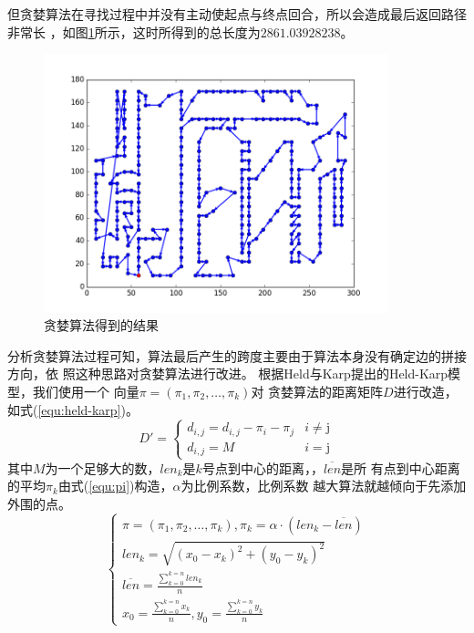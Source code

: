 \documentclass[fontset=windows,a4paper,12pt]{ctexart}
\begin{document}
         但贪婪算法在寻找过程中并没有主动使起点与终点回合，所以会造成最后返回路径非常长
         ，如图\ref{fig:fail}所示，这时所得到的总长度为$2861.03928238$。
         \begin{figure}[htbp]
            \centering
            \includegraphics[width=10cm]{pic/greedy_fail.png}
            \caption{贪婪算法得到的结果}
            \label{fig:fail}
        \end{figure}
        分析贪婪算法过程可知，算法最后产生的跨度主要由于算法本身没有确定边的拼接方向，依
        照这种思路对贪婪算法进行改进。
        根据Held与Karp提出的Held-Karp模型\cite{held1970traveling}，我们使用一个
        向量$\pi=(\pi_1,\pi_2,\dots,\pi_k)$对
        贪婪算法的距离矩阵$D$进行改造，如式(\ref{equ:held-karp})。
        \begin{equation}
	        D'=\left\{
		        \begin{array}{ll}
		        	d_{i,j} = d_{i,j} - \pi_i - \pi_j & \textrm{$i \neq $j}\\
		        	d_{i,j} = M & \textrm{$i=$j}
		        \end{array}
	        \right.
	        \label{equ:held-karp}
        \end{equation}
        其中$M$为一个足够大的数，$len_k$是$k$号点到中心的距离，，$\overline{len}$是所
        有点到中心距离的平均$\pi_k$由式(\ref{equ:pi})构造，$\alpha$为比例系数，比例系数
        越大算法就越倾向于先添加外围的点。
        \begin{equation}
             \left\{
	             \begin{array}{l}
		             \pi=(\pi_1,\pi_2,\dots{,\pi_k}),\pi_k=\alpha\cdot(len_k-\overline{len})\\
		             len_k = \sqrt{(x_0-x_k)^2+(y_0-y_k)^2}\\
		             \overline{len} = \frac{\sum_{k=0}^{k=n}len_k}{n}\\
		             x_0 = \frac{\sum_{k=0}^{k=n}x_k}{n},y_0 = \frac{\sum_{k=0}^{k=n}y_k}{n}
	             \end{array}
             \right.
             \label{equ:pi}
        \end{equation}
\end{document}
